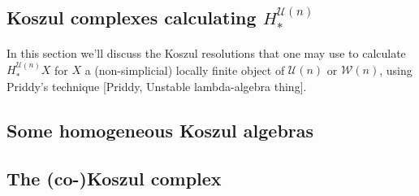 \documentclass[11pt]{amsart}
\theoremstyle{plain}
\newtheorem{prop}[thm]{Proposition}
\theoremstyle{definition}
\renewcommand{\to}{\longrightarrow}
\newcommand{\calW}{\mathcal{W}}
\newcommand{\calU}{\mathcal{U}}
\newcommand{\calC}{\mathcal{C}}
\theoremstyle{plain}
\newcommand{\deltaalg}{\Delta} %
\newcommand{\Sq}{\mathrm{Sq}}
\begin{document}
\begin{Koszul complexes}



\section{Koszul complexes calculating $H_*^{\calU(n)}$}
In this section we'll discuss the Koszul resolutions that one may use to calculate $H_*^{\calU(n)}X$ for $X$ a (non-simplicial) locally finite object of $\calU(n)$ or $\calW(n)$, using Priddy's technique [Priddy, Unstable lambda-algebra thing].
\subsection{Some homogeneous Koszul algebras}

\subsection{The (co-)Koszul complex}


\end{Koszul complexes}
\end{document}
